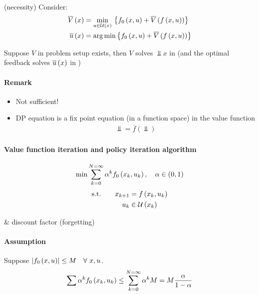 \begin{theorem}{(necessity)}
Consider:
\def\funcval{ f_0 \paren{x,u} + \Vbar{f \paren{x,u}} }
\begin{align}
\Vbar{x} &= \minux{} \set{ \funcval }
    \label{eq:dp-vbar}\\
\ubar{x} &= \argmin \set{ \funcval }
    \label{eq:dp-ubar}
\end{align}

Suppose $V$ in problem setup exists, then $V$ solves
$\Vbar{x}$ in  (and the optimal feedback solves $\ubar{x}$ in  )\\

\paragraph{Remark}
    \begin{itemize}
    \item Not sufficient!
    \item DP equation is a fix point equation
            (in a function space) in the value function
            \begin{align*}
            \Vbar{} = \overline{f} \left( \Vbar{} \right)
            \end{align*}
    \end{itemize}
\end{theorem}

\paragraph{Value function iteration and policy iteration algorithm}
\begin{align}
\min \sum_{k=0}^{N = \infty} \alpha^k f_0 \left( x_k,u_k \right), \quad \alpha \in (0,1)
\end{align}
\begin{alignat*}{6}
\st{} \quad
&& \x{k+1} &= f \paren{x_k,u_k}\\
&& u_k        &\in \setU{x_k}
\end{alignat*}
\begin{variables}
\alpha    & discount factor (forgetting)
\end{variables}

\paragraph{Assumption}
Suppose $\left\lvert f_0 \left( x,u \right) \right\rvert \leq M \quad \forall ~x, u$.
\begin{align*}
\sum \alpha^k f_0 \left( x_k,u_k \right) \leq \sum_{k=0}^{N=\infty} \alpha^k M
    = M \dfrac{\alpha}{1-\alpha}
\end{align*}

